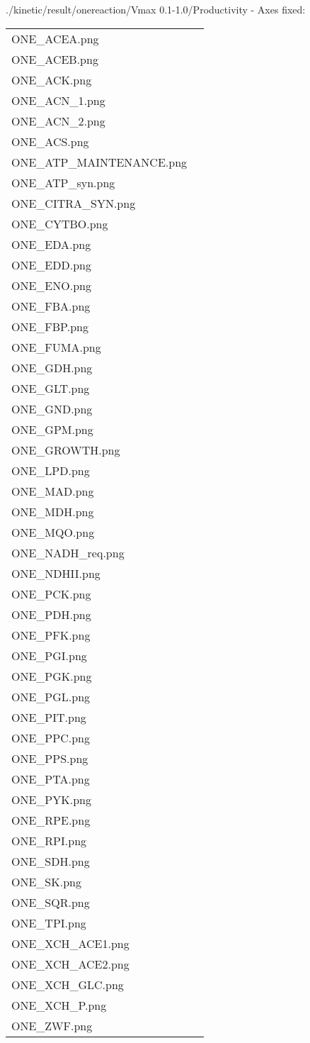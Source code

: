 \documentclass[a4paper, parskip=full]{scrreprt}
\begin{document}
./kinetic/result/onereaction/Vmax 0.1-1.0/Productivity - Axes fixed:

\begin{longtable}{ll}
ONE\_ACEA.png\\
ONE\_ACEB.png\\
ONE\_ACK.png\\
ONE\_ACN\_1.png\\
ONE\_ACN\_2.png\\
ONE\_ACS.png\\
ONE\_ATP\_MAINTENANCE.png\\
ONE\_ATP\_syn.png\\
ONE\_CITRA\_SYN.png\\
ONE\_CYTBO.png\\
ONE\_EDA.png\\
ONE\_EDD.png\\
ONE\_ENO.png\\
ONE\_FBA.png\\
ONE\_FBP.png\\
ONE\_FUMA.png\\
ONE\_GDH.png\\
ONE\_GLT.png\\
ONE\_GND.png\\
ONE\_GPM.png\\
ONE\_GROWTH.png\\
ONE\_LPD.png\\
ONE\_MAD.png\\
ONE\_MDH.png\\
ONE\_MQO.png\\
ONE\_NADH\_req.png\\
ONE\_NDHII.png\\
ONE\_PCK.png\\
ONE\_PDH.png\\
ONE\_PFK.png\\
ONE\_PGI.png\\
ONE\_PGK.png\\
ONE\_PGL.png\\
ONE\_PIT.png\\
ONE\_PPC.png\\
ONE\_PPS.png\\
ONE\_PTA.png\\
ONE\_PYK.png\\
ONE\_RPE.png\\
ONE\_RPI.png\\
ONE\_SDH.png\\
ONE\_SK.png\\
ONE\_SQR.png\\
ONE\_TPI.png\\
ONE\_XCH\_ACE1.png\\
ONE\_XCH\_ACE2.png\\
ONE\_XCH\_GLC.png\\
ONE\_XCH\_P.png\\
ONE\_ZWF.png
\end{longtable}
\end{document}
